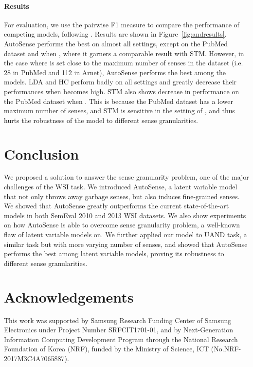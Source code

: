 \documentclass[letterpaper]{article} \usepackage{aaai19}
\begin{document}
\paragraph{Results}

For evaluation, we use the pairwise F1 measure to compare the performance of competing models, following \cite{tang2012unified}. Results are shown in Figure~\ref{fig:andresults}. AutoSense performs the best on almost all settings, except on the PubMed dataset and when , where it garners a comparable result with STM. However, in the case where  is set close to the maximum number of senses in the dataset (i.e. 28 in PubMed and 112 in Arnet), AutoSense performs the best among the models. LDA and HC perform badly on all settings and greatly decrease their performances when  becomes high. STM also shows decrease in performance on the PubMed dataset when . This is because the PubMed dataset has a lower maximum number of senses, and STM is sensitive in the setting of , and thus hurts the robustness of the model to different sense granularities. 

\section{Conclusion} 

We proposed a solution to answer the sense granularity problem, one of the major challenges of the WSI task. We introduced AutoSense, a latent variable model that not only throws away garbage senses, but also induces fine-grained senses. We showed that AutoSense greatly outperforms the current state-of-the-art models in both SemEval 2010 and 2013 WSI datasets. We also show experiments on how AutoSense is able to overcome sense granularity problem, a well-known flaw of latent variable models on. We further applied our model to UAND task, a similar task but with more varying number of senses, and showed that AutoSense performs the best among latent variable models, proving its robustness to different sense granularities.

\section*{Acknowledgements}

This work was supported by Samsung Research Funding
Center of Samsung Electronics under Project Number SRFCIT1701-01, and by Next-Generation Information Computing Development Program through the National Research Foundation of Korea (NRF), funded by the Ministry of Science, ICT (No.NRF-2017M3C4A7065887).



\end{document}
